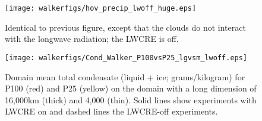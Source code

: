 \documentclass[draft]{agujournal2019}
\begin{document}
{\begin{figure}
    \texttt{[image: walkerfigs/hov\_precip\_lwoff\_huge.eps]}
  \caption{Identical to previous figure, except that the clouds do not interact with the longwave radiation; the LWCRE is off.}
  \label{fig:domdep_lwoff}
\end{figure}

\begin{figure}
  \centering
       \texttt{[image: walkerfigs/Cond\_Walker\_P100vsP25\_lgvsm\_lwoff.eps]}
          \caption{Domain mean total condensate (liquid + ice; grams/kilogram) for P100 (red) and P25 (yellow) on the domain 
          with a long dimension of 16,000km (thick) and 4,000 (thin).  Solid lines show experiments with LWCRE on
          and dashed lines the LWCRE-off experiments.}
  \label{fig:TotCond_P25P100}
\end{figure}


}
\end{document}
